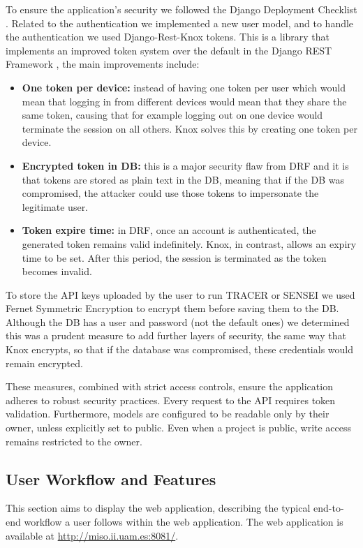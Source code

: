 To ensure the application's security we followed the Django Deployment Checklist \autocite{DeploymentChecklistDjango}.
Related to the authentication we implemented a new user model,
and to handle the authentication we used Django-Rest-Knox \autocite{DjangoRestKnox} tokens.
This is a library that implements an improved token system over the default in the Django REST Framework \autocite{DjangoRESTFramework},
the main improvements include:
\begin{itemize}
  \item \textbf{One token per device:}
    instead of having one token per user
    which would mean that logging in from different devices
    would mean that they share the same token,
    causing that for example
    logging out on one device would terminate the session on all others.
    Knox solves this by creating one token per device.

  \item \textbf{Encrypted token in \ac{DB}:}
    this is a major security flaw from \ac{DRF}
    and it is that tokens are stored as plain text in the \ac{DB},
    meaning that if the \ac{DB} was compromised,
    the attacker could use those tokens to impersonate the legitimate user.

  \item \textbf{Token expire time:}
    in \ac{DRF}, once an account is authenticated, the generated token remains valid indefinitely.
    Knox, in contrast, allows an expiry time to be set.
    After this period, the session is terminated as the token becomes invalid.
\end{itemize}

To store the \ac{API} keys uploaded by the user to run \ac{TRACER} or SENSEI
we used Fernet Symmetric Encryption \autocite{FernetSymmetricEncryption}
to encrypt them before saving them to the \ac{DB}.
Although the \ac{DB} has a user and password (not the default ones)
we determined this was a prudent measure to add further layers of security,
the same way that Knox encrypts, so that
if the database was compromised, these credentials would remain encrypted.

These measures, combined with strict access controls,
ensure the application adheres to robust security practices.
Every request to the \ac{API} requires token validation.
Furthermore, models are configured to be readable only by their owner,
unless explicitly set to public.
Even when a project is public, write access remains restricted to the owner.


\subsection{User Workflow and Features}

This section aims to display the web application,
describing the typical end-to-end workflow
a user follows within the web application.
The web application is available at \url{http://miso.ii.uam.es:8081/}.
